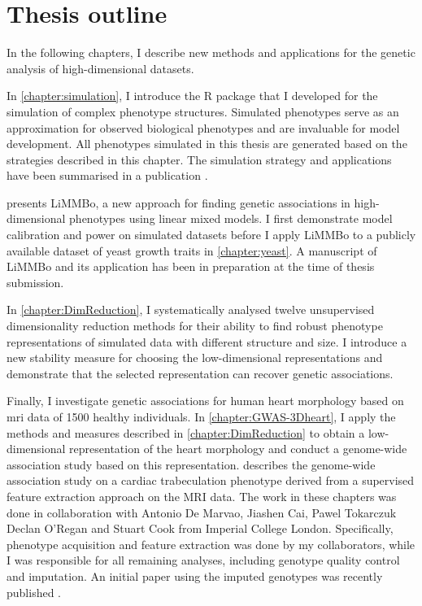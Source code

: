 \section{Thesis outline}
In the following chapters, I describe new methods and applications for the genetic analysis of high-dimensional datasets. 

In \cref{chapter:simulation}, I introduce the R package that I developed for the simulation of complex phenotype structures. Simulated phenotypes serve as an approximation for observed biological phenotypes and are invaluable for model development. All phenotypes simulated in this thesis are generated based on the strategies described in this chapter. The simulation strategy and applications have been summarised in a publication \citep[\textit{under revision}]{Meyer2017a}.

 presents LiMMBo, a new approach for finding genetic associations in high-dimensional phenotypes using linear mixed models. I first demonstrate model calibration and power on simulated datasets before I apply LiMMBo to a publicly available dataset of yeast growth traits in \cref{chapter:yeast}. A manuscript of LiMMBo and its application has been in preparation at the time of thesis submission.

In \cref{chapter:DimReduction}, I systematically analysed twelve unsupervised dimensionality reduction methods for their ability to find robust phenotype representations of simulated data with different structure and size. I introduce a new stability measure for choosing the low-dimensional representations and demonstrate that the selected representation can recover genetic associations.

Finally, I investigate genetic associations for human heart morphology based on \gls{mri} data of \num{1500} healthy individuals. In \cref{chapter:GWAS-3Dheart}, I apply the methods and measures described in \cref{chapter:DimReduction} to obtain a low-dimensional representation of the heart morphology and conduct a genome-wide association study based on this representation.  describes the genome-wide association study on a cardiac trabeculation phenotype derived from a supervised feature extraction approach on the MRI data.  The work in these chapters was done in collaboration with Antonio De Marvao, Jiashen Cai, Pawel Tokarczuk Declan O'Regan and Stuart Cook from Imperial College London. Specifically, phenotype acquisition and feature extraction was done by my collaborators, while I was responsible for all remaining analyses, including genotype quality control and imputation. An initial paper using the imputed genotypes was recently published \citep{Biffi2017}.





